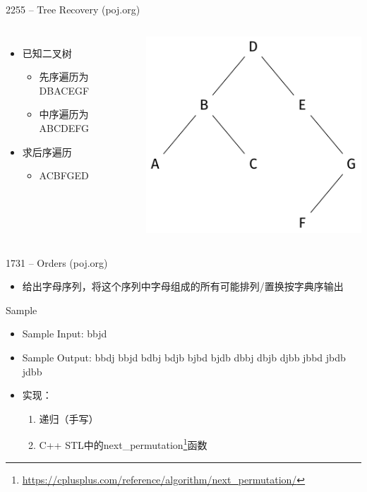 \begin{frame}{2255 -- Tree Recovery (poj.org)}
    \begin{columns}
        \begin{itemize}
        \item 已知二叉树
        \begin{itemize}
            \item 先序遍历为DBACEGF
            \item 中序遍历为ABCDEFG
        \end{itemize}
        \vfill
        \item 求后序遍历
        \begin{itemize}
            \item ACBFGED
        \end{itemize}
    \end{itemize}
    \includegraphics{fig/2-2.pdf}
    \end{columns}
\end{frame}
\begin{frame}{1731 -- Orders (poj.org)}
    \begin{itemize}
        \item 给出字母序列，将这个序列中字母组成的所有可能排列/置换按字典序输出
    \end{itemize}
    \vfill
    \begin{exampleblock}{Sample}
        \begin{itemize}
            \item Sample Input: bbjd
            \item Sample Output: bbdj bbjd bdbj bdjb bjbd bjdb dbbj dbjb djbb jbbd jbdb jdbb
        \end{itemize}
    \end{exampleblock}
    \vfill
    \begin{itemize}
        \item 实现：
        \begin{enumerate}
            \item 递归（手写）
            \item C++ STL中的next\_permutation\footnote{\url{https://cplusplus.com/reference/algorithm/next_permutation/}}函数
        \end{enumerate}
    \end{itemize}
\end{frame}
